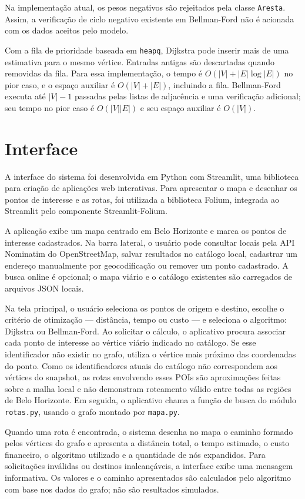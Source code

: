\documentclass[12pt]{article}
\begin{document}
Na implementação atual, os pesos negativos são rejeitados pela classe
\texttt{Aresta}. Assim, a verificação de ciclo negativo existente em
Bellman-Ford não é acionada com os dados aceitos pelo modelo.

Com a fila de prioridade baseada em \texttt{heapq}, Dijkstra pode
inserir mais de uma estimativa para o mesmo vértice. Entradas antigas
são descartadas quando removidas da fila. Para essa implementação, o
tempo é $O(|V|+|E|\log |E|)$ no pior caso, e o espaço auxiliar é
$O(|V|+|E|)$, incluindo a fila. Bellman-Ford executa até
$|V|-1$ passadas pelas listas de adjacência e uma verificação adicional;
seu tempo no pior caso é $O(|V||E|)$ e seu espaço auxiliar é
$O(|V|)$.
\section{Interface}
\label{sec:interface}

A interface do sistema foi desenvolvida em Python com Streamlit, uma biblioteca para criação de aplicações web interativas. Para apresentar o mapa e desenhar os pontos de interesse e as rotas, foi utilizada a biblioteca Folium, integrada ao Streamlit pelo componente Streamlit-Folium.

A aplicação exibe um mapa centrado em Belo Horizonte e marca os pontos de interesse cadastrados. Na barra lateral, o usuário pode consultar locais pela API Nominatim do OpenStreetMap, salvar resultados no catálogo local, cadastrar um endereço manualmente por geocodificação ou remover um ponto cadastrado. A busca online é opcional; o mapa viário e o catálogo existentes são carregados de arquivos JSON locais.

Na tela principal, o usuário seleciona os pontos de origem e destino, escolhe o critério de otimização — distância, tempo ou custo — e seleciona o algoritmo: Dijkstra ou Bellman-Ford. Ao solicitar o cálculo, o aplicativo procura associar cada ponto de interesse ao vértice viário indicado no catálogo. Se esse identificador não existir no grafo, utiliza o vértice mais próximo das coordenadas do ponto. Como os identificadores atuais do catálogo não correspondem aos vértices do snapshot, as rotas envolvendo esses POIs são aproximações feitas sobre a malha local e não demonstram roteamento válido entre todas as regiões de Belo Horizonte. Em seguida, o aplicativo chama a função de busca do módulo \texttt{rotas.py}, usando o grafo montado por \texttt{mapa.py}.

Quando uma rota é encontrada, o sistema desenha no mapa o caminho formado pelos vértices do grafo e apresenta a distância total, o tempo estimado, o custo financeiro, o algoritmo utilizado e a quantidade de nós expandidos. Para solicitações inválidas ou destinos inalcançáveis, a interface exibe uma mensagem informativa. Os valores e o caminho apresentados são calculados pelo algoritmo com base nos dados do grafo; não são resultados simulados.
\end{document}
